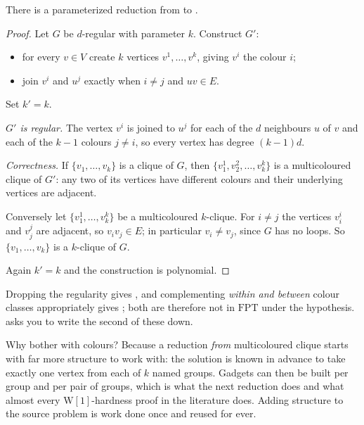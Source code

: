 \begin{lemma}\label{lem:multicoloured-clique}
There is a parameterized reduction from  to
.
\end{lemma}

\begin{proof}
Let $G$ be $d$-regular with parameter $k$. Construct $G'$:
\begin{itemize}[leftmargin=*,nosep]
  \item for every $v \in V$ create $k$ vertices $v^1, \ldots, v^k$, giving
        $v^i$ the colour $i$;
  \item join $v^i$ and $u^j$ exactly when $i \ne j$ and $uv \in E$.
\end{itemize}
Set $k' = k$.

\emph{$G'$ is regular.} The vertex $v^i$ is joined to $u^j$ for each of the $d$
neighbours $u$ of $v$ and each of the $k-1$ colours $j \ne i$, so every vertex
has degree $(k-1)d$.

\emph{Correctness.} If $\{v_1,\ldots,v_k\}$ is a clique of $G$, then
$\{v_1^1, v_2^2, \ldots, v_k^k\}$ is a multicoloured clique of $G'$: any two of
its vertices have different colours and their underlying vertices are adjacent.

Conversely let $\{v_1^1, \ldots, v_k^k\}$ be a multicoloured $k$-clique. For
$i \ne j$ the vertices $v_i^i$ and $v_j^j$ are adjacent, so $v_iv_j \in E$; in
particular $v_i \ne v_j$, since $G$ has no loops. So $\{v_1,\ldots,v_k\}$ is a
$k$-clique of $G$.

Again $k' = k$ and the construction is polynomial.
\end{proof}

Dropping the regularity gives , and complementing
\emph{within and between} colour classes appropriately gives
; both are therefore not in $\mathrm{FPT}$
under the hypothesis.  asks you to write the second
of these down.

\begin{intuition}
Why bother with colours? Because a reduction \emph{from} multicoloured clique
starts with far more structure to work with: the solution is known in advance to
take exactly one vertex from each of $k$ named groups. Gadgets can then be built
per group and per pair of groups, which is what the next reduction does and what
almost every $\mathrm{W}[1]$-hardness proof in the literature does. Adding
structure to the source problem is work done once and reused for ever.
\end{intuition}

